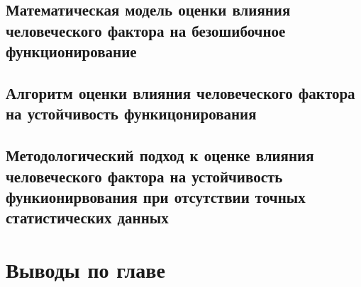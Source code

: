 \subsection{Математическая модель оценки влияния человеческого фактора на безошибочное функционирование}\label{subsec:ch6/sect4/sub1}
\subsection{Алгоритм оценки влияния человеческого фактора на устойчивость функицонирования}\label{subsec:ch6/sect4/sub1}
\subsection{Методологический подход к оценке влияния человеческого фактора на устойчивость функионирвования при отсутствии точных статистических данных}\label{subsec:ch6/sect4/sub1}
\section{Выводы по главе}\label{sec:ch6/sect3}


\clearpage